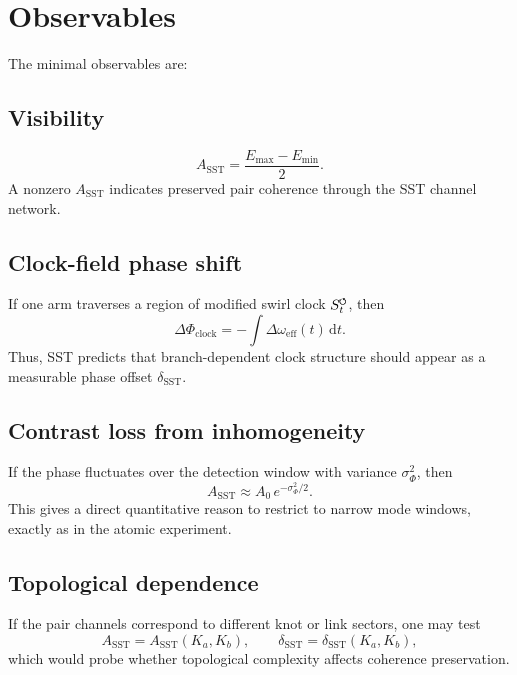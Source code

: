 \documentclass[11pt]{article}
\newcommand{\swirlarrow}{\mathchoice{\mkern-2mu\scriptstyle\boldsymbol{\circlearrowleft}}{\mkern-2mu\scriptstyle\boldsymbol{\circlearrowleft}}{\mkern-2mu\scriptscriptstyle\boldsymbol{\circlearrowleft}}{\mkern-2mu\scriptscriptstyle\boldsymbol{\circlearrowleft}}}
\newcommand{\SwirlClock}{S_t^{\swirlarrow}}
\newcommand{\dd}{\mathrm{d}}
\begin{document}
    \section{Observables}
        
        The minimal observables are:
        
        \subsection{Visibility}
            \begin{equation}
                A_{\mathrm{SST}} = \frac{E_{\max}-E_{\min}}{2}.
                \label{eq:visibility}
            \end{equation}
            A nonzero \(A_{\mathrm{SST}}\) indicates preserved pair coherence through the SST channel network.
        
        \subsection{Clock-field phase shift}
            If one arm traverses a region of modified swirl clock \(\SwirlClock\), then
            \begin{equation}
                \Delta \Phi_{\mathrm{clock}}
                =
                -\int \Delta \omega_{\mathrm{eff}}(t)\,\dd t.
                \label{eq:clock_shift}
            \end{equation}
            Thus, SST predicts that branch-dependent clock structure should appear as a measurable phase offset \(\delta_{\mathrm{SST}}\).
        
        \subsection{Contrast loss from inhomogeneity}
            If the phase fluctuates over the detection window with variance \(\sigma_\Phi^2\), then
            \begin{equation}
                A_{\mathrm{SST}} \approx A_0\,e^{-\sigma_\Phi^2/2}.
                \label{eq:dephasing}
            \end{equation}
            This gives a direct quantitative reason to restrict to narrow mode windows, exactly as in the atomic experiment.
        
        \subsection{Topological dependence}
            If the pair channels correspond to different knot or link sectors, one may test
            \begin{equation}
                A_{\mathrm{SST}} = A_{\mathrm{SST}}(K_a,K_b),\qquad
                \delta_{\mathrm{SST}}=\delta_{\mathrm{SST}}(K_a,K_b),
                \label{eq:topodep}
            \end{equation}
            which would probe whether topological complexity affects coherence preservation.
    
\end{document}
